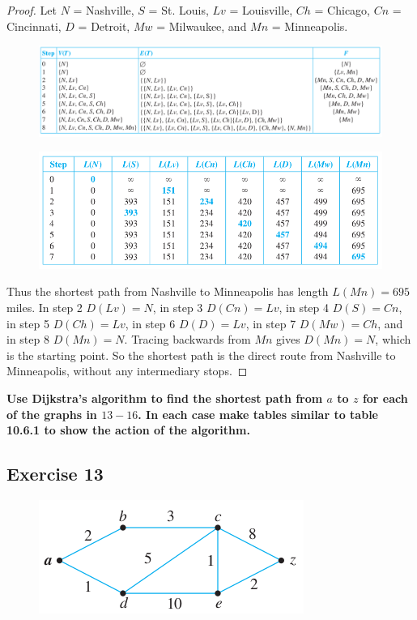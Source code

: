 \documentclass[14pt]{extarticle}
\newcommand{\cy}{\color{cyan}}
\begin{document}
\begin{proof}
    Let \(N\) = Nashville, \(S\) = St. Louis, \(Lv\) = Louisville, \(Ch\) = Chicago, \(Cn\) = Cincinnati, \(D\) = Detroit, \(Mw\)
    = Milwaukee, and \(Mn\) = Minneapolis.

    \begin{figure}[ht!]
        \centering
        \includegraphics[scale=0.45]{../images/10.6.12.2.png}
    \end{figure}

    \begin{figure}[ht!]
        \centering
        \includegraphics[scale=0.5]{../images/10.6.12.3.png}
    \end{figure}

    Thus the shortest path from Nashville to Minneapolis has length \(L(Mn) = 695\) miles. In step 2 \(D(Lv) = N\), in step
    3 \(D(Cn) = Lv\), in step 4 \(D(S) = Cn\), in step 5 \(D(Ch) = Lv\), in step 6 \(D(D) = Lv\), in step 7 \(D(Mw) = Ch\), and
    in step 8 \(D(Mn) = N\). Tracing backwards from \(Mn\) gives \(D(Mn) = N\), which is the starting point. So the shortest
    path is the direct route from Nashville to Minneapolis, without any intermediary stops.
\end{proof}

{\bf \cy Use Dijkstra’s algorithm to find the shortest path from \(a\) to \(z\) for each of the graphs in \(13-16\). In
each case make tables similar to table 10.6.1 to show the action of the algorithm.}

\subsection{Exercise 13}
\begin{figure}[ht!]
    \centering
    \includegraphics[scale=0.6]{../images/10.6.13.png}
\end{figure}
\end{document}
